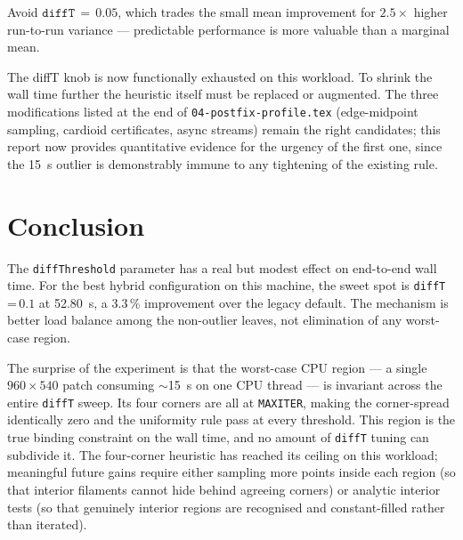 \documentclass[
	english,
	letterpaper, oneside
]{article}
\begin{document}
\noindent
Avoid $\texttt{diffT}\,=\,0.05$, which trades the small mean improvement
for $2.5 \times$ higher run-to-run variance --- predictable performance
is more valuable than a marginal mean.

The diffT knob is now functionally exhausted on this workload. To
shrink the wall time further the heuristic itself must be replaced or
augmented. The three modifications listed at the end of
\texttt{04-postfix-profile.tex} (edge-midpoint sampling, cardioid
certificates, async streams) remain the right candidates; this report
now provides quantitative evidence for the urgency of the first one,
since the 15~s outlier is demonstrably immune to any tightening of the
existing rule.

\section{Conclusion}

The \texttt{diffThreshold} parameter has a real but modest effect on
end-to-end wall time. For the best hybrid configuration on this
machine, the sweet spot is \texttt{diffT}\,=\,$0.1$ at 52.80~s, a
3.3\,\% improvement over the legacy default. The mechanism is better
load balance among the non-outlier leaves, not elimination of any
worst-case region.

The surprise of the experiment is that the worst-case CPU region ---
a single $960 \times 540$ patch consuming $\sim$15~s on one CPU
thread --- is invariant across the entire \texttt{diffT} sweep. Its
four corners are all at \texttt{MAXITER}, making the corner-spread
identically zero and the uniformity rule pass at every threshold.
This region is the true binding constraint on the wall time, and no
amount of \texttt{diffT} tuning can subdivide it. The four-corner
heuristic has reached its ceiling on this workload; meaningful future
gains require either sampling more points inside each region (so that
interior filaments cannot hide behind agreeing corners) or analytic
interior tests (so that genuinely interior regions are recognised and
constant-filled rather than iterated).
\end{document}
